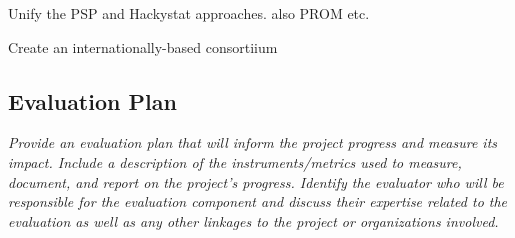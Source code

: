 Unify the PSP and Hackystat approaches. also PROM etc.

Create an internationally-based consortiium

\subsection{Evaluation Plan}

{\em Provide an evaluation plan that will inform the project progress and measure its impact.  Include a description of the instruments/metrics used to measure, document, and report on the project's progress.  Identify the evaluator who will be responsible for the evaluation component and discuss their expertise related to the evaluation as well as any other linkages to the project or organizations involved.  }






